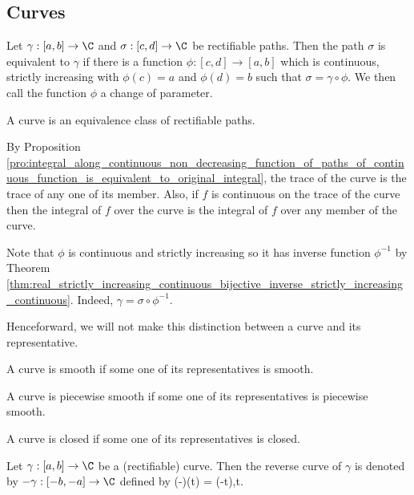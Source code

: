 \subsection{Curves}

\begin{definition}
Let $\gamma:[a,b]\to \C$ and $\sigma:[c,d]\to \C$ be rectifiable paths. Then the path $\sigma$ is equivalent to $\gamma$ if there is a function $\phi:[c,d]\to [a,b]$ which is continuous, strictly increasing with $\phi(c) =a$ and $\phi(d) =b$ such that $\sigma = \gamma \circ \phi$. We then call the function $\phi$ a change of parameter.

A curve is an equivalence class of rectifiable paths.
\end{definition}

\begin{remark}
By Proposition \ref{pro:integral_along_continuous_non_decreasing_function_of_paths_of_continuous_function_is_equivalent_to_original_integral}, the trace of the curve is the trace of any one of its member. Also, if $f$ is continuous on the trace of the curve then the integral of $f$ over the curve is the integral of $f$ over any member of the curve.

Note that $\phi$ is continuous and strictly increasing so it has inverse function $\phi^{-1}$ by Theorem \ref{thm:real_strictly_increasing_continuous_bijective_inverse_strictly_increasing_continuous}. Indeed, $\gamma = \sigma\circ \phi^{-1}$.

Henceforward, we will not make this distinction between a curve and its representative.
\end{remark}



\begin{definition}
A curve is smooth if some one of its representatives is smooth.
\end{definition}

\begin{definition}
A curve is piecewise smooth if some one of its representatives is piecewise smooth.
\end{definition}

\begin{definition}
A curve is closed if some one of its representatives is closed.
\end{definition}

\begin{definition}
Let $\gamma:[a,b]\to \C$ be a (rectifiable) curve. Then the reverse curve of $\gamma$ is denoted by $-\gamma:[-b,-a]\to\C$ defined by
\be
(-\gamma)(t) = \gamma(-t),\quad t\in [-b,-a].
\ee
\end{definition}


